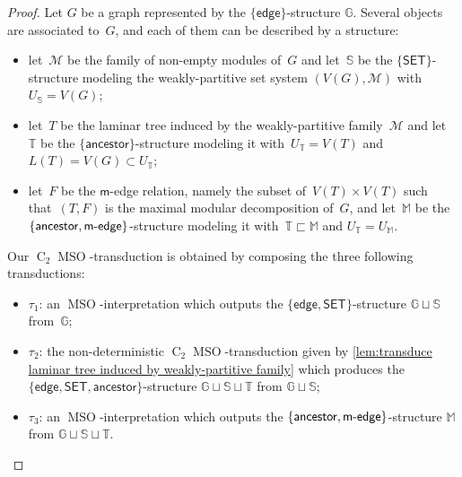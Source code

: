 \documentclass{lmcs} %
\newcommand{\MSO}{\ensuremath{\operatorname{MSO}}\xspace}
\newcommand{\CMSO}[1][]{\ensuremath{\C[#1]{\!\!}\MSO}\xspace}
\newcommand{\C}[1][]{\ensuremath{\operatorname{C}_{#1}}\xspace}
\newcommand{\ancestor}{\mathsf{ancestor}}
\newcommand{\edge}{\ensuremath{\mathsf{edge}}\xspace}
\newcommand{\medge}{\ensuremath{\textsf{m}\text-\mathsf{edge}}\xspace}
\newcommand{\SET}{\ensuremath{\mathsf{SET}}\xspace}
\begin{document}
\begin{proof}
    Let $G$ be a graph represented by the $\{\edge\}$-structure $\mathbb{G}$.
    Several objects are associated to~$G$,
    and each of them can be described by a structure:
    \begin{itemize}[nosep]
        \item let~$\mathcal{M}$ be the family of non-empty modules of~$G$
            and let~$\mathbb{S}$ be the $\{\SET\}$-structure
            modeling the weakly-partitive set system $(V(G),\mathcal{M})$
            with~$U_{\mathbb{S}}=V(G)$;
        \item let~$T$ be the laminar tree induced by the weakly-partitive family~$\mathcal{M}$
            and let~$\mathbb{T}$ be the $\{\ancestor\}$-structure
            modeling it with~$U_{\mathbb{T}}=V(T)$ and~$L(T)=V(G)\subset U_{\mathbb{T}}$;
        \item let~$F$ be the $\mathsf{m}$-edge relation,
            namely the subset of~$V(T)\times V(T)$ such that~$(T,F)$
            is the maximal modular decomposition of~$G$,
            and let~$\mathbb{M}$ be the $\{\ancestor,\medge\}$-structure
            modeling it with~$\mathbb{T}\sqsubset\mathbb{M}$ and $U_{\mathbb{T}}=U_{\mathbb{M}}$.
    \end{itemize}
    Our \CMSO[2]-transduction is obtained by composing the three following transductions:
    \begin{itemize}[nosep]
        \item$\tau_1$: an \MSO-interpretation which outputs the $\{\edge,\SET\}$-structure $\mathbb{G}\sqcup\mathbb{S}$ from~$\mathbb{G}$;
        \item$\tau_2$: the non-deterministic \CMSO[2]-transduction given by \autoref{lem:transduce laminar tree induced by weakly-partitive family}
            which produces the $\{\edge,\SET,\ancestor\}$-structure $\mathbb{G}\sqcup\mathbb{S}\sqcup\mathbb{T}$ from $\mathbb{G}\sqcup\mathbb{S}$;
        \item$\tau_3$: an \MSO-interpretation which outputs the $\{\ancestor,\medge\}$-structure $\mathbb{M}$ from $\mathbb{G}\sqcup\mathbb{S}\sqcup\mathbb{T}$.
    \end{itemize}


\end{proof}
\end{document}
